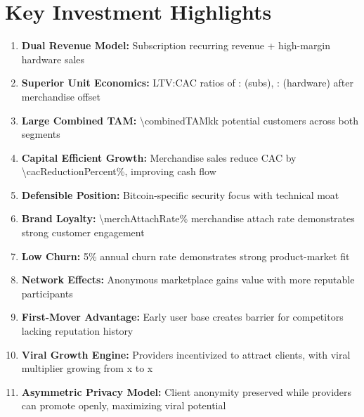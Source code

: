 
\section{Key Investment Highlights}

\begin{enumerate}
  \item \textbf{Dual Revenue Model:} Subscription recurring revenue + high-margin hardware sales
  \item \textbf{Superior Unit Economics:} LTV:CAC ratios of \numint{\subLTV/(\cacDigital - \merchOffsetSubsCalc)}: (subs), \numint{\hwWeightedAvgGP/(\cacEvents - \merchOffsetHwCalc)}: (hardware) after merchandise offset
  \item \textbf{Large Combined TAM:} \num{\combinedTAMk}k potential customers across both segments
  \item \textbf{Capital Efficient Growth:} Merchandise sales reduce CAC by \num{\cacReductionPercent}\%, improving cash flow
  \item \textbf{Defensible Position:} Bitcoin-specific security focus with technical moat
  \item \textbf{Brand Loyalty:} \num{\merchAttachRate}\% merchandise attach rate demonstrates strong customer engagement
  \item \textbf{Low Churn:} \num{5}\% annual churn rate demonstrates strong product-market fit
  \item \textbf{Network Effects:} Anonymous marketplace gains value with more reputable participants
  \item \textbf{First-Mover Advantage:} Early user base creates barrier for competitors lacking reputation history
  \item \textbf{Viral Growth Engine:} Providers incentivized to attract clients, with viral multiplier growing from \numfpeval{\viralMultiplierYearOne}x to \numfpeval{\viralMultiplierYearThree}x\cite{parker2016}
  \item \textbf{Asymmetric Privacy Model:} Client anonymity preserved while providers can promote openly, maximizing viral potential\cite{hbs2016}
\end{enumerate}